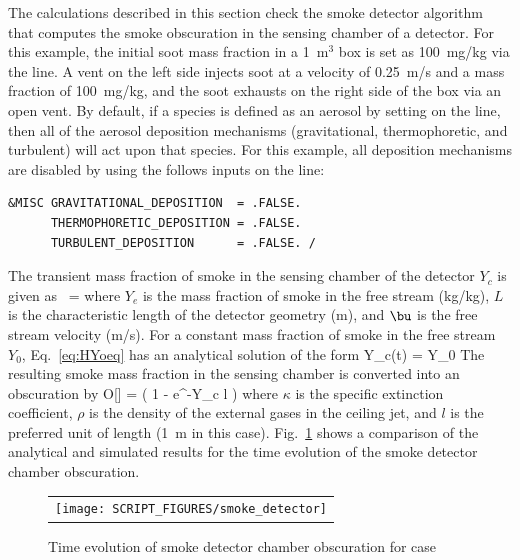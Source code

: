 \documentclass[11pt]{book}
\begin{document}
The calculations described in this section check the smoke detector algorithm that computes the smoke obscuration in the sensing chamber of a detector. For this example, the initial soot mass fraction in a 1~m$^3$ box is set as 100~mg/kg via the  line. A vent on the left side injects soot at a velocity of 0.25~m/s and a mass fraction of 100~mg/kg, and the soot exhausts on the right side of the box via an open vent. By default, if a species is defined as an aerosol by setting  on the  line, then all of the aerosol deposition mechanisms (gravitational, thermophoretic, and turbulent) will act upon that species. For this example, all deposition mechanisms are disabled by using the follows inputs on the  line:

\begin{lstlisting}
&MISC GRAVITATIONAL_DEPOSITION  = .FALSE.
      THERMOPHORETIC_DEPOSITION = .FALSE.
      TURBULENT_DEPOSITION      = .FALSE. /
\end{lstlisting}

\noindent The transient mass fraction of smoke in the sensing chamber of the detector $Y_c$ is given as~\cite{FDS_Tech_Guide}
\be
{} =  \label{eq:HYoeq}
\ee
where $Y_e$ is the mass fraction of smoke in the free stream (kg/kg), $L$ is the characteristic length of the detector geometry (m), and $\bu$ is the free stream velocity (m/s). For a constant mass fraction of smoke in the free stream $Y_0$, Eq.~\ref{eq:HYoeq} has an analytical solution of the form
\be
Y_c(t) = Y_0 
\ee
The resulting smoke mass fraction in the sensing chamber is converted into an obscuration by
\be
O[] = \left( 1 - e^{-\kappa \rho Y_c l} \right) 
\ee
where $\kappa$ is the specific extinction coefficient, $\rho$ is the density of the external gases in the ceiling jet,
and $l$ is the preferred unit of length (1~m in this case).
Fig.~\ref{fig:smoke_detector} shows a comparison of the analytical and simulated results for the time evolution of the smoke detector chamber obscuration.

\begin{figure}[ht]
\centering
\begin{tabular}{c}
\texttt{[image: SCRIPT\_FIGURES/smoke\_detector]}
\end{tabular}
\caption[Smoke detector chamber obscuration for  case]{Time evolution of smoke detector chamber obscuration for  case}
\label{fig:smoke_detector}
\end{figure}
\end{document}
